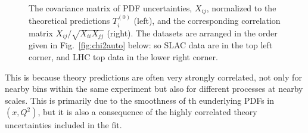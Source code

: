  \begin{figure}[H]
    \begin{center}
    \end{center}
  \vspace{-0.55cm}
  \caption{The covariance matrix of PDF uncertainties, $X_{ij}$, normalized to the theoretical predictions $T^{(0)}_i$  (left), and the corresponding correlation matrix $X_{ij}/\sqrt{X_{ii}X_{jj}}$ (right). The datasets are arranged in the order given in Fig.~\ref{fig:chi2auto} below: so SLAC data are in the top left corner, and LHC top data in the lower right corner.}
  \label{fig:X}
\end{figure}
This is because theory predictions are often very strongly correlated, not only for nearby bins within the same experiment but also for different processes at nearby scales. This is primarily due to the smoothness of th eunderlying PDFs in $(x,Q^2)$, but it is also a consequence of the highly correlated theory uncertainties included in the fit.

